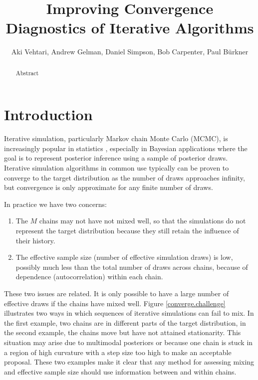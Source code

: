 \documentclass[american,]{article}
\title{Improving Convergence Diagnostics of Iterative Algorithms}
\author{Aki Vehtari, Andrew Gelman, Daniel Simpson, Bob Carpenter, Paul Bürkner}
\date{}
\begin{document}
\maketitle
\begin{abstract}
Abstract
\end{abstract}

\hypertarget{introduction}{%
\section{Introduction}\label{introduction}}

Iterative simulation, particularly Markov chain Monte Carlo (MCMC), is
increasingly popular in statistics \citep{Brooks+Gelman:1998},
especially in Bayesian applications where the goal is to represent
posterior inference using a sample of posterior draws. Iterative
simulation algorithms in common use typically can be proven to converge
to the target distribution as the number of draws approaches infinity,
but convergence is only approximate for any finite number of draws.

In practice we have two concerns:

\begin{enumerate}
\item The $M$ chains may not have not mixed well, so that the simulations do not
represent the target distribution because they still retain the influence of
their history.
\item The effective sample size (number of effective simulation draws) is low,
possibly much less than the total number of draws across chains, because
of dependence (autocorrelation) within each chain.
\end{enumerate}

These two issues are related. It is only possible to have a large number
of effective draws if the chains have mixed well. Figure
\ref{converge.challenge} illustrates two ways in which sequences of
iterative simulations can fail to mix. In the first example, two chains
are in different parts of the target distribution, in the second
example, the chains move but have not attained stationarity. This
situation may arise due to multimodal posteriors or because one chain is
stuck in a region of high curvature with a step size too high to make an
acceptable proposal. These two examples make it clear that any method
for assessing mixing and effective sample size should use information
between and within chains.
\end{document}
